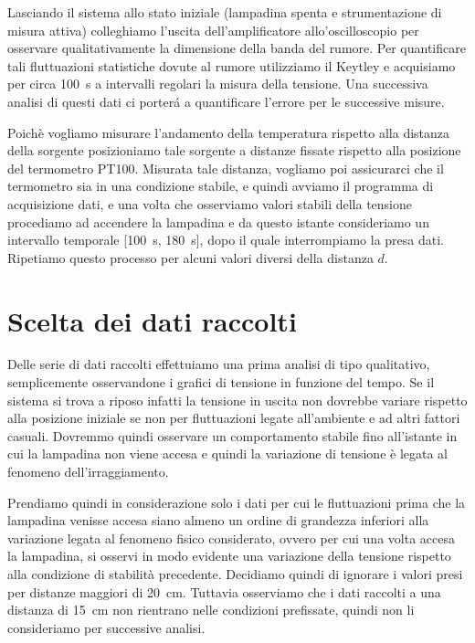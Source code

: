 \documentclass[
    rmp,
    reprint, 
    superscriptaddress, 
    altaffilletter, 
    amsmath, 
    amssymb,
    a4paper]{revtex4-2}
\begin{document}
Lasciando il sistema allo stato iniziale (lampadina spenta e strumentazione di misura attiva) colleghiamo l'uscita dell'amplificatore allo'oscilloscopio per osservare qualitativamente la dimensione della banda del rumore. 
Per quantificare tali fluttuazioni statistiche dovute al rumore utilizziamo il Keytley e acquisiamo per circa \SI{100}{\second} a intervalli regolari la misura della tensione. Una successiva analisi di questi dati ci porter\'a a quantificare l'errore per le successive misure.

Poichè vogliamo misurare l'andamento della temperatura rispetto alla distanza della sorgente posizioniamo tale sorgente a distanze fissate rispetto alla posizione del termometro PT100. Misurata tale distanza, vogliamo poi assicurarci che il termometro sia in una condizione stabile, e quindi avviamo il programma di acquisizione dati, e una volta che osserviamo valori stabili della tensione procediamo ad accendere la lampadina e da questo istante consideriamo un intervallo temporale [\SI{100}{\second}, \SI{180}{\second}], dopo il quale interrompiamo la presa dati. Ripetiamo questo processo per alcuni valori diversi della distanza $d$.

\section*{Scelta dei dati raccolti}
Delle serie di dati raccolti effettuiamo una prima analisi di tipo qualitativo, semplicemente osservandone i grafici di tensione in funzione del tempo. Se il sistema si trova a riposo infatti la tensione in uscita non dovrebbe variare rispetto alla posizione iniziale se non per fluttuazioni legate all'ambiente e ad altri fattori casuali. Dovremmo quindi osservare un comportamento stabile fino all'istante in cui la lampadina non viene accesa e quindi la variazione di tensione è legata al fenomeno dell'irraggiamento. 

Prendiamo quindi in considerazione solo i dati per cui le fluttuazioni prima che la lampadina venisse accesa siano almeno un ordine di grandezza inferiori alla variazione legata al fenomeno fisico considerato, ovvero per cui una volta accesa la lampadina, si osservi in modo evidente una variazione della tensione rispetto alla condizione di stabilità precedente. Decidiamo quindi di ignorare i valori presi per distanze maggiori di \SI{20}{\centi\metre}. Tuttavia  osserviamo che i dati raccolti a una distanza di \SI{15}{\centi\metre} non rientrano nelle condizioni prefissate, quindi non li consideriamo per successive analisi. 
\end{document}
